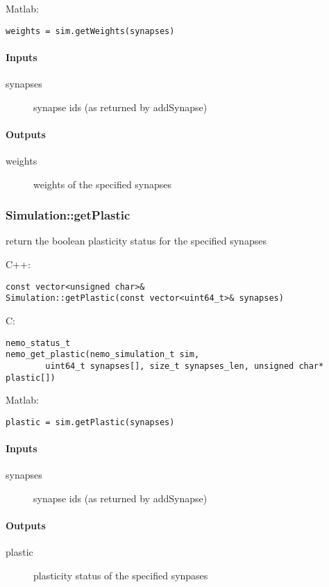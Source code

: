 \noindent Matlab:
\begin{lstlisting}[aboveskip=2pt]
weights = sim.getWeights(synapses)
\end{lstlisting}
\paragraph{Inputs}
\begin{description}
\item[synapses] synapse ids (as returned by addSynapse)
\end{description}
\paragraph{Outputs}
\begin{description}
\item[weights] weights of the specified synapses
\end{description}

\clearpage
\subsubsection*{Simulation::getPlastic}
\label{fn: getPlastic}
return the boolean plasticity status for the specified synapses


\noindent C++:
\begin{lstlisting}[aboveskip=2pt]
const vector<unsigned char>&
Simulation::getPlastic(const vector<uint64_t>& synapses)
\end{lstlisting}

\noindent C:
\begin{lstlisting}[aboveskip=2pt]
nemo_status_t
nemo_get_plastic(nemo_simulation_t sim, 
        uint64_t synapses[], size_t synapses_len, unsigned char* plastic[])
\end{lstlisting}

\noindent Matlab:
\begin{lstlisting}[aboveskip=2pt]
plastic = sim.getPlastic(synapses)
\end{lstlisting}
\paragraph{Inputs}
\begin{description}
\item[synapses] synapse ids (as returned by addSynapse)
\end{description}
\paragraph{Outputs}
\begin{description}
\item[plastic] plasticity status of the specified synpases
\end{description}

